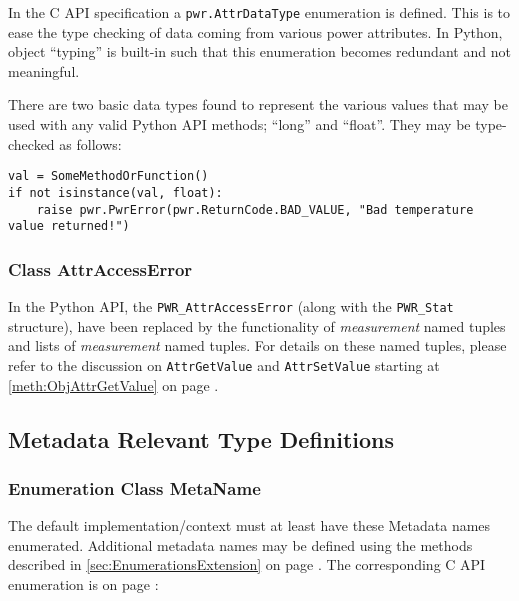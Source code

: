 \documentclass[12pt]{report} %
\begin{document}
\begin{appendices}
In the C API specification a \texttt{pwr.AttrDataType} enumeration is defined.
This is to ease the type checking of data coming from various power attributes.
In Python, object ``typing'' is built-in such that this enumeration
becomes redundant and not meaningful.

There are two basic data types found to represent the various values that may
be used with any valid Python API methods; ``long'' and ``float''. They may be
type-checked as follows:

\begin{center}\begin{minipage}{.95\linewidth}\begin{lstlisting}
val = SomeMethodOrFunction()
if not isinstance(val, float):
    raise pwr.PwrError(pwr.ReturnCode.BAD_VALUE, "Bad temperature value returned!")
\end{lstlisting}\end{minipage}\end{center}

\subsubsection{Class AttrAccessError} \label{class:AttrAccessError}

In the Python API, the \texttt{PWR_AttrAccessError} (along with the
\texttt{PWR_Stat} structure), have been replaced by the functionality of
\textit{measurement} named tuples and lists of \textit{measurement} named tuples. For
details on these named tuples, please refer to the discussion on \texttt{AttrGetValue}
and \texttt{AttrSetValue} starting at \ref{meth:ObjAttrGetValue} on page
\pageref{meth:ObjAttrGetValue}.

\subsection{Metadata Relevant Type Definitions}
\label{sec:PythonMetadataRelevantTypeDefinitions}

\subsubsection{Enumeration Class MetaName}\label{class:MetaName}

The default implementation/context must at least have these Metadata names
enumerated. Additional metadata names may be defined using the methods
described in \ref{sec:EnumerationsExtension} on page
\pageref{sec:EnumerationsExtension}. The corresponding C API enumeration is on
page \pageref{type:MetaName}:



\end{appendices}
\end{document}
